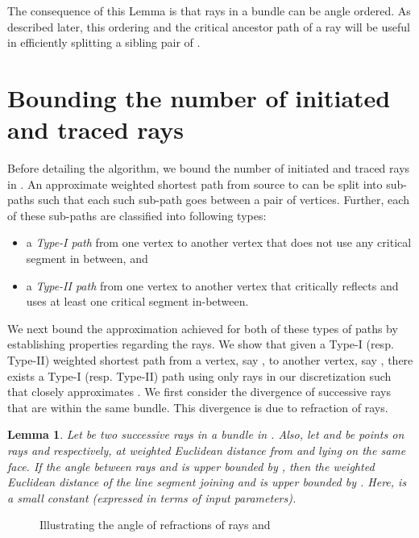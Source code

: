 \documentclass[11pt]{article}
\newtheorem{lemma}{Lemma}[section]
\begin{document}
The consequence of this Lemma is that  rays in a bundle  can be angle ordered. 
As described later, this ordering and the critical ancestor path of a ray will be useful in efficiently splitting a sibling pair of .




\section{Bounding the number of initiated and traced rays}
\label{sect:boundrays}

Before detailing the algorithm, we bound the number of initiated and traced rays in .
An approximate weighted shortest path from source  to  can be split into sub-paths such that each such sub-path goes between a pair of vertices. 
Further, each of these sub-paths are classified into following types:

\begin{itemize}
\item
a {\it Type-I path} from one vertex to another vertex that does not use any critical segment in between, and

\item
a {\it Type-II path} from one vertex to another vertex that critically reflects and uses at least one critical segment in-between.
\end{itemize}

We next bound the approximation achieved for both of these types of paths by establishing properties regarding the rays.
We show that given a Type-I (resp. Type-II) weighted shortest path  from a vertex, say , to another vertex, say , there exists a Type-I (resp. Type-II) path  using only rays in our discretization such that  closely approximates .
We first consider the divergence of successive rays that are within the same bundle. 
This divergence is due to refraction of rays. 


\begin{lemma}
\label{lem:depsilon}
Let  be two successive rays in a bundle in .
Also, let  and  be points on rays  and  respectively, at weighted Euclidean distance  from  and lying on the same face.
If the angle between rays  and  is upper bounded by , then the weighted Euclidean distance of the line segment joining  and  is upper bounded by . 
Here,  is a small constant (expressed in terms of input parameters).
\end{lemma}

\begin{wrapfigure}{r}{0.5\textwidth}
\centering
\begin{minipage}[b]{.4\textwidth}
\caption{\footnotesize Illustrating the angle of refractions of rays  and }
\label{fig:refrangles}
\end{minipage}
\end{wrapfigure}
\end{document}
